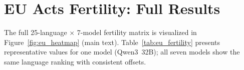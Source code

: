 \documentclass[11pt,a4paper]{article}
\begin{document}
\appendix

\section{EU Acts Fertility: Full Results}
\label{app:eu_fertility}

The full 25-language $\times$ 7-model fertility matrix is visualized in Figure~\ref{fig:eu_heatmap} (main text). Table~\ref{tab:eu_fertility} presents representative values for one model (Qwen3~32B); all seven models show the same language ranking with consistent offsets.
\end{document}
